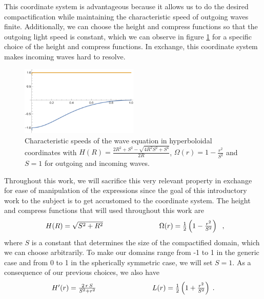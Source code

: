 This coordinate system is advantageous because it allows us to do the desired compactification while maintaining the characteristic speed of outgoing waves finite. Additionally, we can choose the height and compress functions so that the outgoing light speed is constant, which we can observe in figure \ref{fig:Good_Speeds} for a specific choice of the height and compress functions. In exchange, this coordinate system makes incoming waves hard to resolve. 

\begin{figure}[h]
    \centering
    \includegraphics[width=0.5\textwidth]{Images/Good_Speeds.png}
    \caption{Characteristic speeds of the wave equation in hyperboloidal coordinates with $H(R) = \frac{2 R^2 + S^2 - \sqrt{4 R^2 S^2 + S^4}}{2R}$, $\Omega(r) = 1 - \frac{r^2}{S^2}$ and $S = 1$ for outgoing and incoming waves.}
    \label{fig:Good_Speeds}
\end{figure}

Throughout this work, we will sacrifice this very relevant property in exchange for ease of manipulation of the expressions since the goal of this introductory work to the subject is to get accustomed to the coordinate system. The height and compress functions that will used throughout this work are
%
\begin{equation}
    \begin{array}{l c r}
        H(R) = \sqrt{S^2+R^2} & \qquad\qquad\qquad & \Omega(r) = \frac{1}{2} \left(1 - \frac{r^2}{S^2}\right)
    \end{array} \; ,
\end{equation}
%
where $S$ is a constant that determines the size of the compactified domain, which we can choose arbitrarily. To make our domains range from -1 to 1 in the generic case and from 0 to 1 in the spherically symmetric case, we will set $S=1$. As a consequence of our previous choices, we also have
%
\begin{equation}
    \begin{array}{l c r}
        H'(r) = \frac{2 \, r \, S}{S^2 + r^2} & \qquad\qquad\qquad & L(r) = \frac{1}{2} \left(1 + \frac{r^2}{S^2}\right) \; .
    \end{array}
\end{equation}


